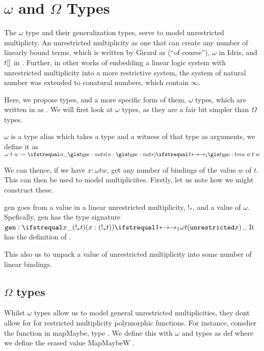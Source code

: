 \section{$\omega$ and $\Omega$ Types}

\label{sec:omega_types}

The $\omega$ type and their generalization \tomega types, serve to model unrestricted multiplicty. 
An unrestricted multiplicity as one that can create any number of linearly bound terms, which is written by Girard as \code{!} (``of course''), $\omega$ in Idris, and $t \mathtt{[]}$ in \granule \cite{linear_logic,idris,granule}. 
Further, in other works of embedding a linear logic system with unrestricted multiplicity into a more restrictive system, the system of natural number was extended to conatural numbers, which contain $\infty$.

Here, we propose \tomega types, and a more specific form of them, $\omega$ types, which are written in \thislib as .
We will first look at $\omega$ types, as they are a fair bit simpler than $\Omega$ types.

\begin{definition}
	$\omega$ is a type alias which takes a type and a witness of that type as arguments, we define it as $\omega \ t \ w \deq \fn1 n : \nat . \tm n t w$
\end{definition}

We can thence, if we have $x : \omega t w$, get any number of bindings of the value $w$ of $t$.
This can then be used to model multipliciites.
Firstly, let us note how we might construct these.

\begin{definition}
  \ident gen goes from a value in a linear unrestricted multiplicity, $!_*$, and a value of $\omega$.
  Spefically, \ident gen has the type signature $\code{gen} : \fn1 x : (!_* t) . \omega t (\code{unrestricted} x)$..
  It has the definition of \missingcode .
\end{definition}

This also us to unpack a value of unrestricted multiplicity into some number of linear bindings.

\subsection{$\Omega$ types}

Whilst $\omega$ types allow us to model general unrestricted multiplicities, they dont allow for for restricted multiplicity polymorphic functions.
For instance, consdier the function in \granule \ident mapMaybe, \marker type .
We define this with $\omega$ and \tmu types as \marker def where we define the erased value \marker MapMaybeW .

